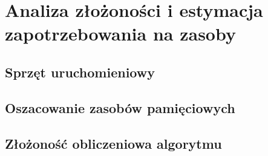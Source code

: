 \section{Analiza złożoności i estymacja zapotrzebowania na zasoby}
\subsection{Sprzęt uruchomieniowy}
\subsection{Oszacowanie zasobów pamięciowych}
\subsection{Złożoność obliczeniowa algorytmu}